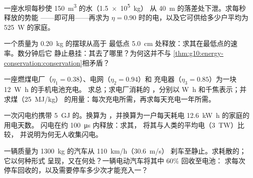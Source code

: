 \begin{exercise}[$\star\star$]\label{exo:g10:energy-conservation:10}
一座水坝每秒使 \qty{150}{m^3} 的水（\qty{1.5e5}{kg}）
从 \qty{40}{m} 的落差处下泄。求每秒释放的势能
——即可用——再求为
$\eta = 0.90$ 时的电，以及它可供给多少户平均为 \qty{525}{W} 的家庭。
\end{exercise}

\begin{exercise}[$\star\star$]\label{exo:g10:energy-conservation:11}
一个质量为 \qty{0.20}{kg} 的摆球从高于
最低点 \qty{5.0}{cm} 处释放：求其在最低点的速率。数分钟后它
静止悬挂：其去了哪里？为何这并不与
\cref{thm:g10:energy-conservation:conservation}相矛盾？
\end{exercise}

\begin{exercise}[$\star\star\star$]\label{exo:g10:energy-conservation:12}
一座燃煤电厂（$\eta_1 = 0.38$）、电网（$\eta_2 = 0.94$）和
充电器（$\eta_3 = 0.85$）为一块 \qty{12}{W.h} 的手机电池充电。
求总；求电厂消耗的
，分别以 \unit{W.h} 和千焦表示；并求煤（\qty{25}{MJ/kg}）
的用量：每次充电所需，再求每天充电一年所需。
\end{exercise}

\begin{exercise}[$\star\star\star$]\label{exo:g10:energy-conservation:13}
一次闪电约携带 \qty{5}{GJ} 的。换算为
，并换算为一户每天耗电 \qty{12.6}{kW.h} 的家庭的用电天数。
闪电在约 \qty{100}{\micro s} 内释放：求其，
将其与人类的平均电（\qty{3}{TW}）比较，
并说明为何无人收集闪电。
\end{exercise}

\begin{exercise}[$\star\star\star$]\label{exo:g10:energy-conservation:14}
一辆质量为 \qty{1300}{kg} 的汽车从 \qty{110}{km/h}（\qty{30.6}{m/s}）
刹车至静止。求耗散的；它以何种形式
呈现，又在何处？一辆电动汽车将其中 $60\%$ 回收至电池：
求每次停车回收的，以及需要停车多少次才能充入一？
\end{exercise}

